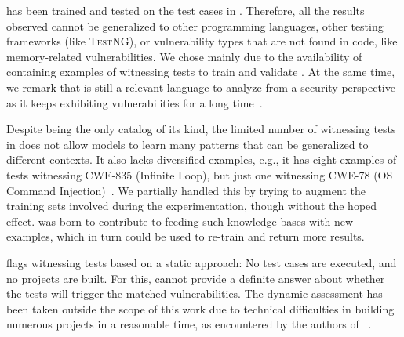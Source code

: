 
\vuteco has been trained and tested on the \JUnit test cases in \VulforJ.
Therefore, all the results observed cannot be generalized to other programming languages, other testing frameworks (like \textsc{TestNG}), or vulnerability types that are not found in \Java code, like memory-related vulnerabilities.
We chose \Java mainly due to the availability of \VulforJ containing examples of witnessing tests to train and validate \vuteco.
At the same time, we remark that \Java is still a relevant language to analyze from a security perspective as it keeps exhibiting vulnerabilities for a long time~\cite{veracode}.

Despite being the only catalog of its kind, the limited number of witnessing tests in \VulforJ does not allow models to learn many patterns that can be generalized to different contexts.
It also lacks diversified examples, e.g., it has eight examples of tests witnessing CWE-835 (Infinite Loop), but just one witnessing CWE-78 (OS Command Injection)~\cite{bui:msr2022:vul4j}.
We partially handled this by trying to augment the training sets involved during the experimentation, though without the hoped effect.
\vuteco was born to contribute to feeding such knowledge bases with new examples, which in turn could be used to re-train \vuteco and return more results.



\vuteco flags witnessing tests based on a static approach: No test cases are executed, and no projects are built.
For this, \vuteco cannot provide a definite answer about whether the tests will trigger the matched vulnerabilities.
The dynamic assessment has been taken outside the scope of this work due to technical difficulties in building numerous projects in a reasonable time, as encountered by the authors of \VulforJ~\cite{bui:msr2022:vul4j}.

